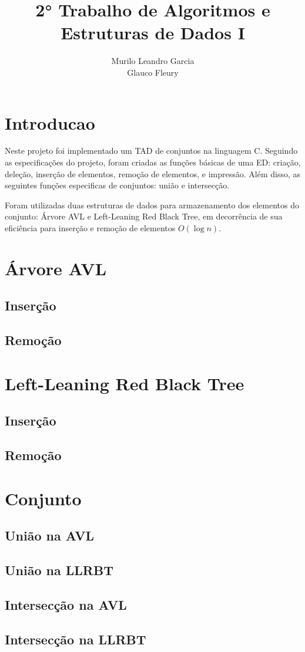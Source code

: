 \documentclass{article}
\title{2° Trabalho de Algoritmos e Estruturas de Dados I}
\author{
    Murilo Leandro Garcia \\ 
    Glauco Fleury
}
\date{}
\begin{document}
\maketitle

\section{Introducao}
Neste projeto foi implementado um TAD de conjuntos na linguagem C. Seguindo as especificações do projeto,
foram criadas as funções básicas de uma ED: criação, deleção, inserção de elementos, remoção de elementos, 
e impressão. Além disso, as seguintes funções especificas de conjuntos: união e intersecção.

Foram utilizadas duas estruturas de dados para armazenamento dos elementos do conjunto:
Árvore AVL e Left-Leaning Red Black Tree, em decorrência de sua eficiência para inserção e remoção de elementos
$O(\log n)$.

\section{Árvore AVL}
\subsection{Inserção}
\subsection{Remoção}

\section{Left-Leaning Red Black Tree}
\subsection{Inserção}
\subsection{Remoção}

\section{Conjunto}
\subsection{União na AVL}
\subsection{União na LLRBT}
\subsection{Intersecção na AVL}
\subsection{Intersecção na LLRBT}
\end{document}
